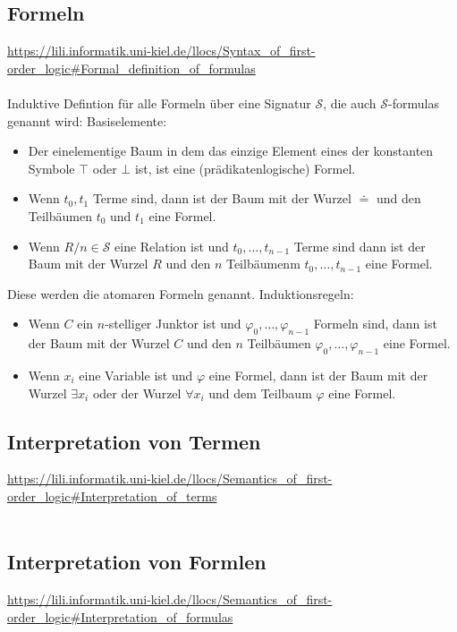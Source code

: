 \documentclass[twocolumn]{article}
\begin{document}
    \subsection{Formeln}
    \url{https://lili.informatik.uni-kiel.de/llocs/Syntax_of_first-order_logic#Formal_definition_of_formulas}\\\\
    Induktive Defintion für alle Formeln über eine Signatur $\mathcal{S}$, die auch $\mathcal{S}$-formulas genannt wird:
    Basiselemente:\\
    \begin{itemize}
        \item Der einelementige Baum in dem das einzige Element eines der konstanten Symbole $\top$ oder $\bot$ ist, ist eine (prädikatenlogische) Formel.
        \item Wenn $t_0,t_1$ Terme sind, dann ist der Baum mit der Wurzel $\doteq$ und den Teilbäumen $t_0$ und $t_1$ eine Formel.
        \item Wenn $R/n \in \mathcal S$ eine Relation ist und $t_0,\dots,t_{n-1}$ Terme sind dann ist der Baum mit der Wurzel $R$ und den $n$ Teilbäumenm $t_0, \dots, t_{n-1}$ eine Formel.
    \end{itemize}
    Diese werden die atomaren Formeln genannt.
    Induktionsregeln:\\
    \begin{itemize}
        \item Wenn $C$ ein $n$-stelliger Junktor ist und $\varphi_0,\dots,\varphi_{n-1}$ Formeln sind, dann ist der Baum mit der Wurzel $C$ und den $n$ Teilbäumen $\varphi_0,\dots,\varphi_{n-1}$ eine Formel.
        \item Wenn $x_i$ eine Variable ist und $\varphi$ eine Formel, dann ist der Baum mit der Wurzel $\exists x_i$ oder der Wurzel $\forall x_i$ und dem Teilbaum $\varphi$ eine Formel.
    \end{itemize}

    \subsection{Interpretation von Termen}
    \url{https://lili.informatik.uni-kiel.de/llocs/Semantics_of_first-order_logic#Interpretation_of_terms}\\\\

    \subsection{Interpretation von Formlen}
    \url{https://lili.informatik.uni-kiel.de/llocs/Semantics_of_first-order_logic#Interpretation_of_formulas}\\\\
\end{document}
